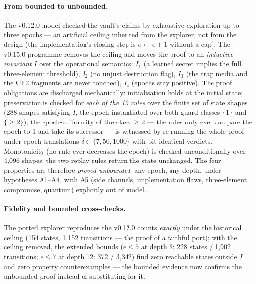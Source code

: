 \documentclass[11pt,a4paper]{article}
\begin{document}
\paragraph{From bounded to unbounded.} The v0.12.0 model checked the
vault's claims by exhaustive exploration up to three epochs --- an
artificial ceiling inherited from the explorer, not from the design (the
implementation's closing step is $e \leftarrow e+1$ without a cap). The
v0.15.0 programme removes the ceiling and moves the proof to an
\emph{inductive invariant} $I$ over the operational semantics:
$I_1$ (a learned secret implies the full three-element threshold),
$I_2$ (no unjust destruction flag), $I_3$ (the trap media and the CF2
fragments are never touched), $I_4$ (epochs stay positive). The proof
obligations are discharged mechanically: initialisation holds at the
initial state; preservation is checked for \emph{each of the 13 rules}
over the finite set of state shapes (288 shapes satisfying $I$, the
epoch instantiated over both guard classes $\{1\}$ and $\{\ge 2\}$); the
epoch-uniformity of the class $\ge 2$ --- the rules only ever compare
the epoch to 1 and take its successor --- is witnessed by re-running the
whole proof under epoch translations $\delta \in \{7, 50, 1000\}$ with
bit-identical verdicts. Monotonicity (no rule ever decreases the epoch)
is checked unconditionally over 4{,}096 shapes; the two replay rules
return the state unchanged. The four properties are therefore
\emph{proved unbounded}: any epoch, any depth, under hypotheses
A1--A4, with A5 (side channels, implementation flaws, three-element
compromise, quantum) explicitly out of model.

\paragraph{Fidelity and bounded cross-checks.} The ported explorer
reproduces the v0.12.0 counts \emph{exactly} under the historical
ceiling (154 states, 1{,}152 transitions --- the proof of a faithful
port); with the ceiling removed, the extended bounds ($e \le 5$ at depth
8: 228 states / 1{,}902 transitions; $e \le 7$ at depth 12: 372 /
3{,}342) find zero reachable states outside $I$ and zero property
counterexamples --- the bounded evidence now confirms the unbounded
proof instead of substituting for it.
\end{document}
